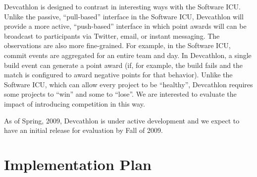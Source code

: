 Devcathlon is designed to contrast in interesting ways with the Software
ICU.  Unlike the passive, ``pull-based'' interface in the Software ICU,
Devcathlon will provide a more active, ``push-based'' interface in which
point awards will can be broadcast to participants via Twitter, email, or
instant messaging.  The observations are also more fine-grained. For example, in the
Software ICU, commit events are aggregated for an entire team and day.  In
Devcathlon, a single build event can generate a point award (if, for
example, the build fails and the match is configured to award negative
points for that behavior).  Unlike the Software ICU, which can allow every
project to be ``healthy'', Devcathlon requires some projects to ``win'' and
some to ``lose''.  We are interested to evaluate the impact of introducing
competition in this way.

As of Spring, 2009, Devcathlon is under active development and we expect to
have an initial release for evaluation by Fall of 2009.


\section{Implementation Plan}
\label{sec:implementation}





